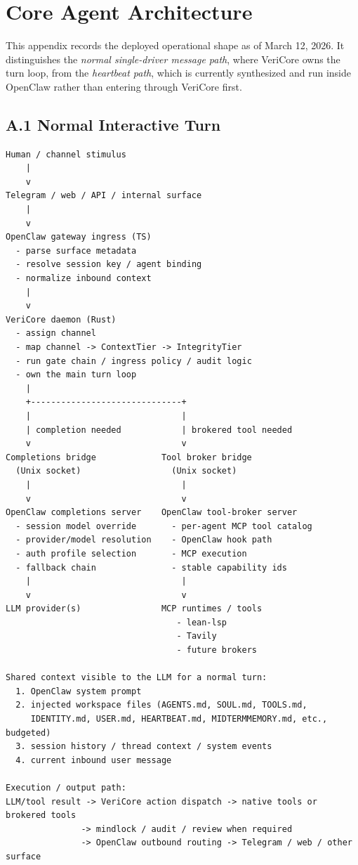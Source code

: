 \documentclass[11pt]{article}
\begin{document}
\appendix

\section{Core Agent Architecture}
This appendix records the deployed operational shape as of March 12, 2026. It distinguishes the \emph{normal single-driver message path}, where VeriCore owns the turn loop, from the \emph{heartbeat path}, which is currently synthesized and run inside OpenClaw rather than entering through VeriCore first.

\subsection{A.1 Normal Interactive Turn}
\begin{lstlisting}[style=code]
Human / channel stimulus
    |
    v
Telegram / web / API / internal surface
    |
    v
OpenClaw gateway ingress (TS)
  - parse surface metadata
  - resolve session key / agent binding
  - normalize inbound context
    |
    v
VeriCore daemon (Rust)
  - assign channel
  - map channel -> ContextTier -> IntegrityTier
  - run gate chain / ingress policy / audit logic
  - own the main turn loop
    |
    +------------------------------+
    |                              |
    | completion needed            | brokered tool needed
    v                              v
Completions bridge             Tool broker bridge
  (Unix socket)                  (Unix socket)
    |                              |
    v                              v
OpenClaw completions server    OpenClaw tool-broker server
  - session model override       - per-agent MCP tool catalog
  - provider/model resolution    - OpenClaw hook path
  - auth profile selection       - MCP execution
  - fallback chain               - stable capability ids
    |                              |
    v                              v
LLM provider(s)                MCP runtimes / tools
                                  - lean-lsp
                                  - Tavily
                                  - future brokers

Shared context visible to the LLM for a normal turn:
  1. OpenClaw system prompt
  2. injected workspace files (AGENTS.md, SOUL.md, TOOLS.md,
     IDENTITY.md, USER.md, HEARTBEAT.md, MIDTERMMEMORY.md, etc., budgeted)
  3. session history / thread context / system events
  4. current inbound user message

Execution / output path:
LLM/tool result -> VeriCore action dispatch -> native tools or brokered tools
               -> mindlock / audit / review when required
               -> OpenClaw outbound routing -> Telegram / web / other surface
\end{lstlisting}
\end{document}
